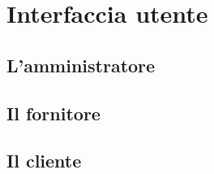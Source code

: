 \documentclass{article}
\begin{document}
% 
% 
 \section{Interfaccia utente}
 
 \subsection{L'amministratore}
 
 \subsection{Il fornitore}
 
 \subsection{Il cliente}
 


\end{document}
